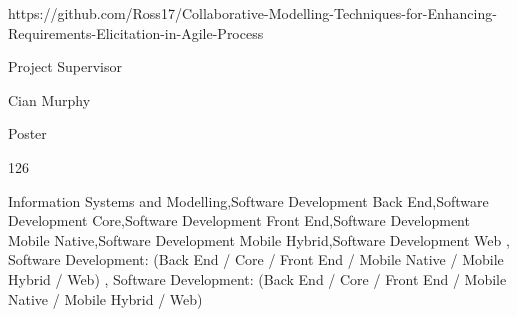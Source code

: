 \documentclass[twoside]{report}
\begin{document}
{https://github.com/Ross17/Collaborative-Modelling-Techniques-for-Enhancing-Requirements-Elicitation-in-Agile-Process}

{Project Supervisor}

{}

{Cian Murphy}

{Poster}

{126}

{Information Systems and Modelling,Software Development Back End,Software Development Core,Software Development Front End,Software Development Mobile Native,Software Development Mobile Hybrid,Software Development Web}
{, Software Development: (Back End / Core / Front End / Mobile Native / Mobile Hybrid / Web)}
{, Software Development: (Back End / Core / Front End / Mobile Native / Mobile Hybrid / Web)}

\endgroup

\DefaultLayout
\end{document}
